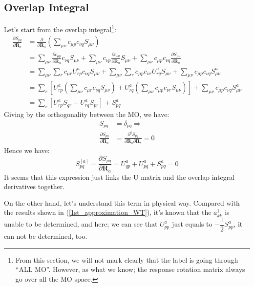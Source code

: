 \subsection{Overlap Integral}\label{overlap_int_general_derivatives}
%
%
Let's start from the overlap integral\footnote{From this section, we will not
mark clearly that the label is going through ``ALL MO''. However, as what we
know; the response rotation matrix always go over all the MO space.}:
\begin{align}
\label{overlap_MO_INT_gradient_eq:1}
\frac{\partial S_{pq}}{\partial \bm{R}_{a}} &= \frac{\partial}{\partial
\bm{R}_{a}}\left( \sum_{\mu\nu}c_{\mu p}c_{\nu q}S_{\mu\nu}\right) \nonumber\\
&= \sum_{\mu\nu}\frac{\partial c_{\mu p}}{\partial \bm{R}_{a}}c_{\nu
q}S_{\mu\nu} + \sum_{\mu\nu}c_{\nu p}\frac{\partial c_{\nu  q}}{\partial
\bm{R}_{a}}S_{\mu\nu} + \sum_{\mu\nu}c_{\mu p}c_{\nu q}\frac{\partial
S_{\mu\nu}}{\partial \bm{R}_{a}} \nonumber\\
&= \sum_{\mu\nu}\sum_{r}c_{\mu r}U^{a}_{rp}c_{\nu
q}S_{\mu\nu} + \sum_{\mu\nu}\sum_{r}c_{\mu p}c_{\nu r}U^{a}_{rq}S_{\mu\nu} +
\sum_{\mu\nu}c_{\mu p}c_{\nu q}S^{a}_{\mu\nu} \nonumber \\
&= \sum_{r}\left[U^{a}_{rp} \left( \sum_{\mu\nu}c_{\mu r}c_{\nu
q}S_{\mu\nu}\right)  + U^{a}_{rq}\left( \sum_{\mu\nu}c_{\mu p}c_{\nu
r}S_{\mu\nu}\right) \right]  + \sum_{\mu\nu}c_{\mu p}c_{\nu q}S^{a}_{\mu\nu}
\nonumber \\
&= \sum_{r}\left[U^{a}_{rp}S_{qr} + U^{a}_{rq}S_{pr}\right]  + S^{a}_{pq}
\end{align}
Giving by the orthogonality between the MO, we have:
\begin{align}
 \label{overlap_MO_INT_gradient_eq:2}
S_{pq} &= \delta_{pq} \Longrightarrow \nonumber \\
\frac{\partial S_{pq} }{\partial \bm{R}_{a}} &= \frac{\partial^{q} S_{pq}
}{\partial \bm{R}_{a}\partial \bm{R}_{b}} = 0
\end{align}
Hence we have:
\begin{equation}
 \label{overlap_MO_INT_gradient_eq:3}
S_{pq}^{[a]} = \frac{\partial S_{pq}}{\partial \bm{R}_{a}} = U^{a}_{qp} +
U^{a}_{pq} + S^{a}_{pq} = 0
\end{equation} 
It seems that this expression just links the U matrix and the overlap integral
derivatives together. 

On the other hand, let's understand this term in physical
way. Compared with the results shown in (\ref{1st_approximation_WT}),
it's known that the $a^{1}_{kk}$ is unable to be determined, and here;
we can see that $U^{a}_{pp}$ just equals to $-\dfrac{1}{2}S^{a}_{pp}$,
it can not be determined, too.

